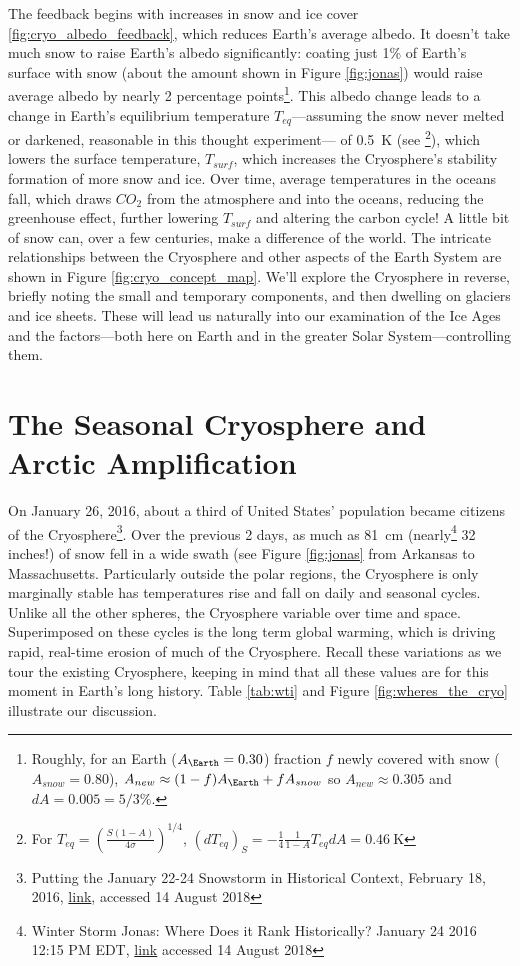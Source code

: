 The feedback begins with increases in snow and ice cover \ref{fig:cryo_albedo_feedback}, which reduces Earth's average albedo. It doesn't take much snow to raise Earth's albedo significantly: coating just 1\% of Earth's surface with snow (about the amount shown in Figure \ref{fig:jonas}) would raise average albedo by nearly 2 percentage points\footnote{Roughly, for an Earth ($A_\Earth=0.30$) fraction $f$ newly covered with snow ($A_{snow}=0.80$), $A_{new} \approx (1-f)A_\Earth+fA_{snow}$ so $A_{new} \approx 0.305$ and $dA=0.005=5/3\%$.}. This albedo change leads to a change in Earth's equilibrium temperature $T_{eq}$---assuming the snow never melted or darkened, reasonable in this thought experiment--- of \SI{0.5}{K} (see \footnote{For $T_{eq}=\left(\frac{S(1-A)}{4\sigma}\right)^{1/4}$, $\left(dT_{eq}\right)_S=-\frac{1}{4}\frac{1}{1-A}T_{eq}dA=\SI{0.46}{\kelvin}$}), which lowers the surface temperature, $T_{surf}$, which increases the Cryosphere's stability formation of more snow and ice. Over time, average temperatures in the oceans fall, which draws $CO_2$ from the atmosphere and into the oceans, reducing the greenhouse effect, further lowering $T_{surf}$ and altering the carbon cycle! A little bit of snow can, over a few centuries, make a difference of the world. The intricate relationships between the Cryosphere and other aspects of the Earth System are shown in Figure \ref{fig:cryo_concept_map}. We'll explore the Cryosphere in reverse, briefly noting the small and temporary components, and then dwelling on glaciers and ice sheets. These will lead us naturally into our examination of the Ice Ages and the factors---both here on Earth and in the greater Solar System---controlling them. 

 

 
\section{The Seasonal Cryosphere and Arctic Amplification}
On January 26, 2016, about a third of United States' population became citizens of the Cryosphere\footnote{Putting the January 22-24 Snowstorm in Historical Context, February 18, 2016, \href{https://www.ncdc.noaa.gov/news/january-22-24-2016-snowstorm-in-historical-context}{link}, accessed 14 August 2018}. Over the previous 2 days, as much as \SI{81}{\centi\metre} (nearly\footnote{Winter Storm Jonas: Where Does it Rank Historically? January 24 2016 12:15 PM EDT, \href{https://weather.com/storms/winter/news/winter-storm-jonas-rank-in-history}{link} accessed 14 August 2018} 32 inches!) of snow fell in a wide swath (see Figure \ref{fig:jonas} from Arkansas to Massachusetts. Particularly outside the polar regions, the Cryosphere is only marginally stable has temperatures rise and fall on daily and seasonal cycles. Unlike all the other spheres, the Cryosphere variable over time and space. Superimposed on these cycles is the long term global warming, which is driving rapid, real-time erosion of much of the Cryosphere. Recall these variations as we tour the existing Cryosphere, keeping in mind that all these values are for this moment in Earth's long history. Table \ref{tab:wti} and Figure \ref{fig:wheres_the_cryo} illustrate our discussion.
